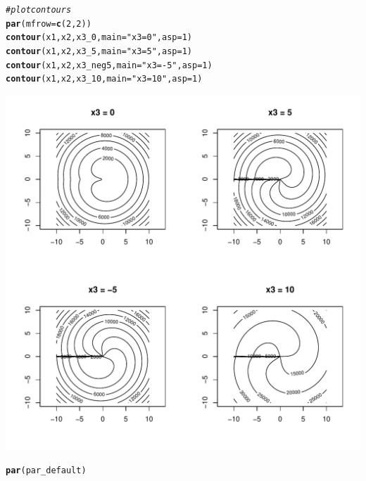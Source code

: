 \documentclass{article}\usepackage[]{graphicx}\usepackage[]{color}
\makeatletter
\def\maxwidth{ %
  \ifdim\Gin@nat@width>\linewidth
    \linewidth
  \else
    \Gin@nat@width
  \fi
}
\newcommand{\hlnum}[1]{\textcolor[rgb]{0.686,0.059,0.569}{#1}}%
\newcommand{\hlstr}[1]{\textcolor[rgb]{0.192,0.494,0.8}{#1}}%
\newcommand{\hlcom}[1]{\textcolor[rgb]{0.678,0.584,0.686}{\textit{#1}}}%
\newcommand{\hlstd}[1]{\textcolor[rgb]{0.345,0.345,0.345}{#1}}%
\newcommand{\hlkwc}[1]{\textcolor[rgb]{0.333,0.667,0.333}{#1}}%
\newcommand{\hlkwd}[1]{\textcolor[rgb]{0.737,0.353,0.396}{\textbf{#1}}}%
\newenvironment{kframe}{%
 \def\at@end@of@kframe{}%
 \ifinner\ifhmode%
  \def\at@end@of@kframe{\end{minipage}}%
  \begin{minipage}{\columnwidth}%
 \fi\fi%
 \def\FrameCommand##1{\hskip\@totalleftmargin \hskip-\fboxsep
 \colorbox{shadecolor}{##1}\hskip-\fboxsep
     \hskip-\linewidth \hskip-\@totalleftmargin \hskip\columnwidth}%
 \MakeFramed {\advance\hsize-\width
   \@totalleftmargin\z@ \linewidth\hsize
   \@setminipage}}%
 {\par\unskip\endMakeFramed%
 \at@end@of@kframe}
\newenvironment{knitrout}{}{} %
\makeatother
\begin{document}
\begin{knitrout}
\begin{kframe}
\begin{alltt}
\hlcom{#plot contours}
\hlkwd{par}\hlstd{(}\hlkwc{mfrow} \hlstd{=} \hlkwd{c}\hlstd{(}\hlnum{2}\hlstd{,} \hlnum{2}\hlstd{))}
\hlkwd{contour}\hlstd{(x1, x2, x3_0,} \hlkwc{main} \hlstd{=} \hlstr{"x3 = 0"}\hlstd{,} \hlkwc{asp} \hlstd{=} \hlnum{1}\hlstd{)}
\hlkwd{contour}\hlstd{(x1, x2, x3_5,} \hlkwc{main} \hlstd{=} \hlstr{"x3 = 5"}\hlstd{,} \hlkwc{asp} \hlstd{=} \hlnum{1}\hlstd{)}
\hlkwd{contour}\hlstd{(x1, x2, x3_neg5,} \hlkwc{main} \hlstd{=} \hlstr{"x3 = -5"}\hlstd{,} \hlkwc{asp} \hlstd{=} \hlnum{1}\hlstd{)}
\hlkwd{contour}\hlstd{(x1, x2, x3_10,} \hlkwc{main} \hlstd{=} \hlstr{"x3 = 10"}\hlstd{,} \hlkwc{asp} \hlstd{=} \hlnum{1}\hlstd{)}
\end{alltt}
\end{kframe}
\includegraphics[width=\maxwidth]{figure/unnamed-chunk-4-1} 
\begin{kframe}\begin{alltt}
\hlkwd{par}\hlstd{(par_default)}


\end{alltt}
\end{kframe}
\end{knitrout}
\end{document}
